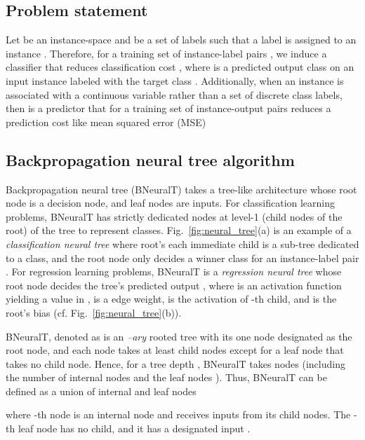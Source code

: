 \documentclass[11pt,a4paper]{article}
\begin{document}
\subsection{Problem statement} 
    \label{sec:problem_stmt}
    Let  be an instance-space and  be a set of  labels such that a label  is assigned to an instance . Therefore, for a training set of  instance-label pairs , we induce a classifier  that reduces classification cost 
    , 
    where  is a predicted output class on an input instance  labeled with the target class . Additionally, when an instance  is associated with a continuous variable  rather than  a set of  discrete class labels, then  is a predictor that for a training set of instance-output pairs  reduces a prediction cost like mean squared error (MSE) 
    
    \subsection{Backpropagation neural tree algorithm}
    Backpropagation neural tree (BNeuralT) takes a tree-like architecture whose root node is a decision node, and leaf nodes are inputs. For classification learning problems, BNeuralT has strictly dedicated nodes at level-1 (child nodes of the root) of the tree to represent classes. Fig.~\ref{fig:neural_tree}(a) is an example of a \textit{classification neural tree} where root's each immediate child is a sub-tree dedicated to a class, and the root node only decides a winner class  for an instance-label pair . For regression learning problems, BNeuralT is a \textit{regression neural tree} whose root node decides the tree's predicted output , where  is an activation function yielding a value in ,  is a edge weight,  is the activation of -th child, and  is the root's bias (cf. Fig.~\ref{fig:neural_tree}(b)).
    
    BNeuralT, denoted as  is an \textit{--ary} rooted tree with its one node designated as the root node, and each node takes at least  child nodes except for a leaf node that takes no child node. Hence, for a tree depth , BNeuralT takes  nodes (including the number of internal nodes  and the leaf nodes ). Thus, BNeuralT can be defined as a union of internal and leaf nodes    

where -th node  is an internal node and receives  inputs from its child nodes. The -th leaf node  has no child, and it has a designated input . 
    
\end{document}
